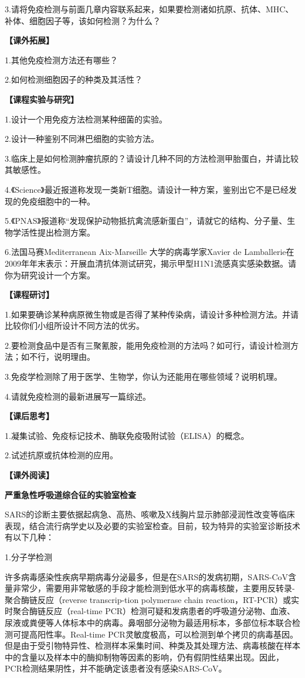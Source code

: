 3.请将免疫检测与前面几章内容联系起来，如果要检测诸如抗原、抗体、MHC、补体、细胞因子等，该如何检测？为什么？

\noindent\textbf{【课外拓展】}

1.其他免疫检测方法还有哪些？

2.如何检测细胞因子的种类及其活性？

\noindent\textbf{【课程实验与研究】}

1.设计一个用免疫方法检测某种细菌的实验。

2.设计一种鉴别不同淋巴细胞的实验方法。

3.临床上是如何检测肿瘤抗原的？请设计几种不同的方法检测甲胎蛋白，并请比较其敏感性。

4.《Science》最近报道称发现一类新T细胞。请设计一种方案，鉴别出它不是已经发现的免疫细胞中的一种。

5.《PNAS》报道称“发现保护动物抵抗禽流感新蛋白”，请就它的结构、分子量、生物学活性提出检测方案。

6.法国马赛Mediterranean Aix-Marseille 大学的病毒学家Xavier de
Lamballerie在2009年年末表示：开展血清抗体测试研究，揭示甲型H1N1流感真实感染数据。请你为研究设计一个方案。

\noindent\textbf{【课程研讨】}

1.如果要确诊某种病原微生物或是否得了某种传染病，请设计多种检测方法。并请比较你们小组所设计不同方法的优劣。

2.要检测食品中是否有三聚氰胺，能用免疫检测的方法吗？如可行，请设计检测方法；如不行，说明理由。

3.免疫学检测除了用于医学、生物学，你认为还能用在哪些领域？说明机理。

4.请就免疫检测的最新进展写一篇综述。

\noindent\textbf{【课后思考】}

1.凝集试验、免疫标记技术、酶联免疫吸附试验（ELISA）的概念。

2.试述抗原或抗体检测的应用。

\noindent\textbf{【课外阅读】}

\begin{center}
 \textbf{\Large 严重急性呼吸道综合征的实验室检查}
 \end{center}

SARS的诊断主要依据起病急、高热、咳嗽及X线胸片显示肺部浸润性改变等临床表现，结合流行病学史以及必要的实验室检查。目前，较为特异的实验室诊断技术有以下几种：

1.分子学检测

许多病毒感染性疾病早期病毒分泌最多，但是在SARS的发病初期，SARS-CoV含量非常少，需要用非常敏感的手段才能检测到低水平的病毒核酸，主要用反转录-聚合酶链反应（reverse
transcrip-tion polymerase chain
reaction，RT-PCR）或实时聚合酶链反应（real-time
PCR）检测可疑和发病患者的呼吸道分泌物、血液、尿液或粪便等人体标本中的病毒。鼻咽部分泌物为最适用标本，多部位标本联合检测可提高阳性率。Real-time
PCR灵敏度极高，可以检测到单个拷贝的病毒基因。但是由于受引物特异性、检测样本采集时间、种类及其处理方法、病毒核酸在样本中的含量以及样本中的酶抑制物等因素的影响，仍有假阴性结果出现。因此，PCR检测结果阴性，并不能确定该患者没有感染SARS-CoV。

